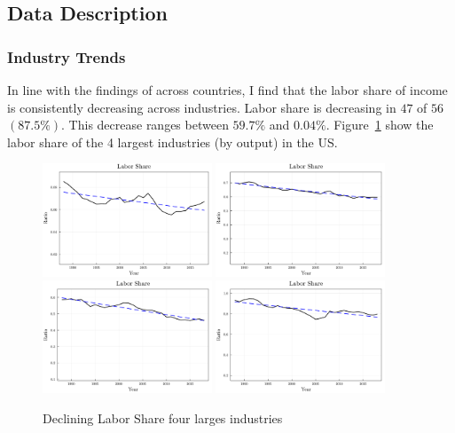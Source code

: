 \documentclass[12pt]{article}
\begin{document}
\subsection{Data Description}

\subsubsection{Industry Trends}

In line with the findings of \citet{karabarbounis2014global} across countries, I find that the labor share of income is consistently decreasing across industries. Labor share is decreasing in $47$ of $56$ $(87.5\%)$. This decrease ranges between $59.7\%$ and $0.04\%$. Figure~\ref*{fig:labor_share_by_industry} show the labor share of the 4 largest industries (by output) in the US. 
\begin{figure}%
 \centering
 \includegraphics[width=0.45\textwidth]{../images/industries/labor_share/dec531.pdf}
 \hspace*{0.05\textwidth}
 \includegraphics[width=0.45\textwidth]{../images/industries/labor_share/dec44RT.pdf}
 \vfill
 \includegraphics[width=0.45\textwidth]{../images/industries/labor_share/dec42.pdf}
 \hspace*{0.05\textwidth}
 \includegraphics[width=0.45\textwidth]{../images/industries/labor_share/dec23.pdf}
 \caption{\label{fig:labor_share_by_industry} Declining Labor Share four larges industries}
\end{figure}
\end{document}
